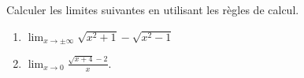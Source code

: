 

\begin{exercice}\label{exoINGE11140030}

	Calculer les limites suivantes en utilisant les règles de calcul.
	\begin{enumerate}

		\item
			$\lim_{x\to \pm\infty} \sqrt{x^2+1}-\sqrt{x^2-1}$

		\item
			$\lim_{x\to 0} \frac{ \sqrt{x+4}-2 }{ x }$.

	\end{enumerate}

\end{exercice}
